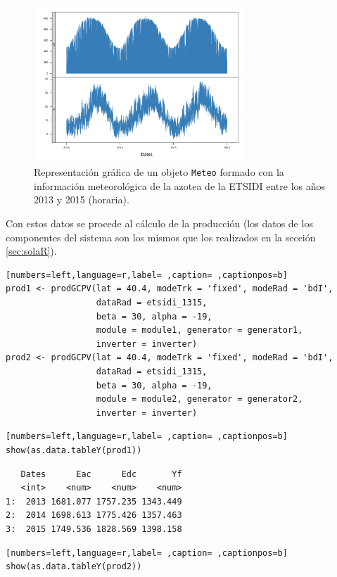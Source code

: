 \begin{figure}[htbp]
\centering
\includegraphics[width=0.7\textwidth]{figuras/ejemplos3.pdf}
\caption{Representación gráfica de un objeto \texttt{Meteo} formado con la información meteorológica de la azotea de la ETSIDI entre los años 2013 y 2015 (horaria).}
\end{figure}
Con estos datos se procede al cálculo de la producción (los datos de los componentes del sistema son los mismos que los realizados en la sección \ref{sec:solaR}).

\begin{lstlisting}[numbers=left,language=r,label= ,caption= ,captionpos=b]
prod1 <- prodGCPV(lat = 40.4, modeTrk = 'fixed', modeRad = 'bdI',
                  dataRad = etsidi_1315,
                  beta = 30, alpha = -19, 
                  module = module1, generator = generator1,
                  inverter = inverter)
prod2 <- prodGCPV(lat = 40.4, modeTrk = 'fixed', modeRad = 'bdI',
                  dataRad = etsidi_1315,
                  beta = 30, alpha = -19, 
                  module = module2, generator = generator2,
                  inverter = inverter)
\end{lstlisting}

\begin{lstlisting}[numbers=left,language=r,label= ,caption= ,captionpos=b]
show(as.data.tableY(prod1))
\end{lstlisting}

\begin{verbatim}
   Dates      Eac      Edc       Yf
   <int>    <num>    <num>    <num>
1:  2013 1681.077 1757.235 1343.449
2:  2014 1698.613 1775.426 1357.463
3:  2015 1749.536 1828.569 1398.158
\end{verbatim}


\begin{lstlisting}[numbers=left,language=r,label= ,caption= ,captionpos=b]
show(as.data.tableY(prod2))
\end{lstlisting}

